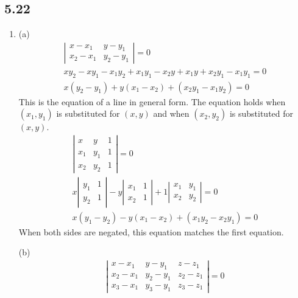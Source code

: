\documentclass[a4paper, 12pt]{article}
\begin{document}
	\subsection*{5.22}
	\begin{enumerate}
		\item (a)
		\begin{gather*}
		\left| \begin{array}{cc}
		x - x_1 & y - y_1 \\
		x_2 - x_1 & y_2 - y_1
		\end{array} \right| = 0 \\
		xy_2 - xy_1 - x_1y_2 + x_1y_1 - x_2y + x_1y + x_2y_1 - x_1y_1 = 0 \\
		x(y_2 - y_1) + y(x_1 - x_2) + (x_2y_1 - x_1y_2) = 0
		\end{gather*}
		This is the equation of a line in general form. The equation holds when $(x_1, y_1)$ is substituted for $(x, y)$ and when $(x_2, y_2)$ is substituted for $(x, y)$.
		\begin{gather*}
		\left| \begin{array}{ccc}
		x & y & 1 \\
		x_1 & y_1 & 1 \\
		x_2 & y_2 & 1
		\end{array} \right| = 0 \\
		x \left| \begin{array}{cc}
		y_1 & 1 \\
		y_2 & 1
		\end{array} \right|
		- y \left| \begin{array}{cc}
		x_1 & 1 \\
		x_2 & 1
		\end{array} \right|
		+ 1 \left| \begin{array}{cc}
		x_1 & y_1 \\
		x_2 & y_2
		\end{array} \right| = 0 \\
		x(y_1 - y_2) - y(x_1 - x_2) + (x_1y_2 - x_2y_1) = 0
		\end{gather*}
		When both sides are negated, this equation matches the first equation. \par
		(b)
		\begin{gather*} 
		\left| \begin{array}{ccc}
			x - x_1 & y - y_1 & z - z_1 \\
			x_2 - x_1 & y_2 - y_1 & z_2 - z_1 \\
			x_3 - x_1 & y_3 - y_1 & z_3 - z_1
		\end{array} \right| = 0 \\

\end{gather*}
\end{enumerate}
\end{document}
